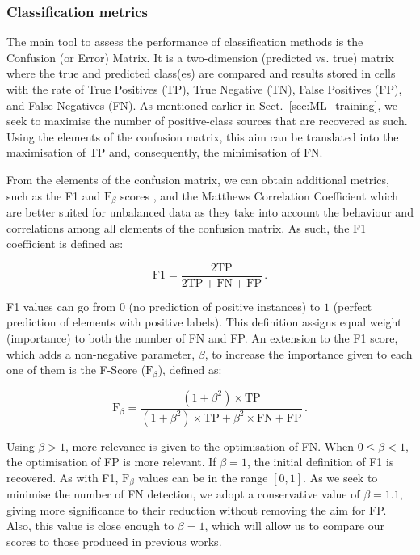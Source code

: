 \documentclass{aa}
\begin{document}
\subsubsection{Classification metrics}\label{sec:metrics_classfication}

The main tool to assess the performance of classification methods is the Confusion (or Error) Matrix. It is a two-dimension (predicted vs. true) matrix where the true and predicted class(es) are compared and results stored in cells with the rate of True Positives (TP), True Negative (TN), False Positives (FP), and False Negatives (FN). As mentioned earlier in Sect.~\ref{sec:ML_training}, we seek to maximise the number of positive-class sources that are recovered as such. Using the elements of the confusion matrix, this aim can be translated into the maximisation of TP and, consequently, the minimisation of FN.

From the elements of the confusion matrix, we can obtain additional metrics, such as the F1 and $\mathrm{F}_{\beta}$ scores \citep{10.2307/1932409, sorenson1948method, van1979information}, and the Matthews Correlation Coefficient \citep[MCC;][]{10.2307/2340126, nla.cat-vn81100, MATTHEWS1975442} which are better suited for unbalanced data as they take into account the behaviour and correlations among all elements of the confusion matrix.
As such, the F1 coefficient is defined as: 

\begin{equation}\label{eq:f1}
\mathrm{F1} = \frac{2 \mathrm{TP}}{2 \mathrm{TP} + \mathrm{FN} + \mathrm{FP}}\,.
\end{equation}

\noindent 
F1 values can go from $0$ (no prediction of positive instances) to $1$ (perfect prediction of elements with positive labels). This definition assigns equal weight (importance) to both the number of FN and FP. An extension to the F1 score, which adds a non-negative parameter, $\beta$, to increase the importance given to each one of them is the F-Score ($\mathrm{F}_{\beta}$), defined as:

\begin{equation}\label{eq:f_beta}
\mathrm{F}_{\beta} = \frac{(1 + \beta^{2}) \times \mathrm{TP}}{(1 + \beta^{2}) \times \mathrm{TP} + \beta^{2} \times \mathrm{FN} + \mathrm{FP}}\,.
\end{equation}

Using ${\beta > 1}$, more relevance is given to the optimisation of FN. When ${0 \leq \beta < 1}$, the optimisation of FP is more relevant. If $\beta = 1$, the initial definition of F1 is recovered. As with F1, $\mathrm{F}_{\beta}$ values can be in the range ${[0, 1]}$. As we seek to minimise the number of FN detection, we adopt a conservative value of ${\beta = 1.1}$, giving more significance to their reduction without removing the aim for FP. Also, this value is close enough to $\beta = 1$, which will allow us to compare our scores to those produced in previous works.
\end{document}
